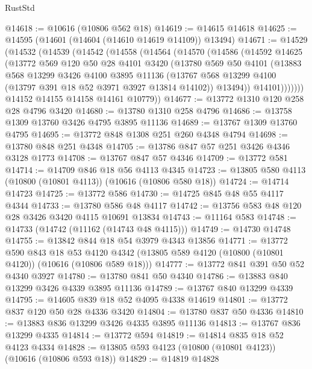 \begin{lexlean}{RustStd}
\begin{coremodule}
@14618 := @10616 (@10806 @562 @18)
@14619 := @14615 @14618
@14625 := @14595 (@14601 (@14604 (@14610 @14619 @14109)) @13494)
@14671 := @14529
    (@14532
      (@14539
        (@14542
          (@14558
            (@14564
              (@14570
                (@14586
                  (@14592
                    @14625
                    (@13772
                      @569
                      @120
                      @50
                      @28
                      @4101
                      @3420
                      (@13780
                        @569
                        @50
                        @4101
                        (@13883
                          @568
                          @13299
                          @3426
                          @4100
                          @3895
                          @11136
                          (@13767 @568 @13299 @4100 (@13797 @391 @18 @52 @3971 @3927 @13814 @14102))
                          @13494))
                      @14101)))))))
        @14152
        @14155
        @14158
        @14161
        @10779))
@14677 := @13772 @1310 @120 @258 @28 @4796 @3420
@14680 := @13780 @1310 @258 @4796
@14686 := @13758 @1309 @13760 @3426 @4795 @3895 @11136
@14689 := @13767 @1309 @13760 @4795
@14695 := @13772 @848 @1308 @251 @260 @4348 @4794
@14698 := @13780 @848 @251 @4348
@14705 := @13786 @847 @57 @251 @3426 @4346 @3128 @1773
@14708 := @13767 @847 @57 @4346
@14709 := @13772 @581
@14714 := @14709 @846 @18 @56 @4113 @4345
@14723 := @13805 @580 @4113 (@10800 (@10801 @4113)) (@10616 (@10806 @580 @18))
@14724 := @14714 @14723
@14725 := @13772 @586
@14730 := @14725 @845 @48 @55 @4117 @4344
@14733 := @13780 @586 @48 @4117
@14742 := @13756 @583 @48 @120 @28 @3426 @3420 @4115 @10691 @13834
@14743 := @11164 @583
@14748 := @14733 (@14742 (@11162 (@14743 @48 @4115)))
@14749 := @14730 @14748
@14755 := @13842 @844 @18 @54 @3979 @4343 @13856
@14771 := @13772
    @590
    @843
    @18
    @53
    @4120
    @4342
    (@13805 @589 @4120 (@10800 (@10801 @4120)) (@10616 (@10806 @589 @18)))
@14777 := @13772 @841 @391 @50 @52 @4340 @3927
@14780 := @13780 @841 @50 @4340
@14786 := @13883 @840 @13299 @3426 @4339 @3895 @11136
@14789 := @13767 @840 @13299 @4339
@14795 := @14605 @839 @18 @52 @4095 @4338 @14619
@14801 := @13772 @837 @120 @50 @28 @4336 @3420
@14804 := @13780 @837 @50 @4336
@14810 := @13883 @836 @13299 @3426 @4335 @3895 @11136
@14813 := @13767 @836 @13299 @4335
@14814 := @13772 @594
@14819 := @14814 @835 @18 @52 @4123 @4334
@14828 := @13805 @593 @4123 (@10800 (@10801 @4123)) (@10616 (@10806 @593 @18))
@14829 := @14819 @14828

\end{coremodule}
\end{lexlean}
